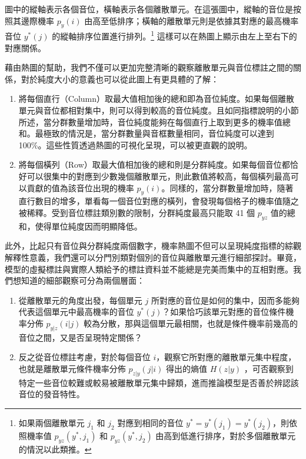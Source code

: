         圖中的縱軸表示各個音位，橫軸表示各個離散單元。在這張圖中，縱軸的音位是按照其邊際機率 \(p_y(i)\) 由高至低排序；橫軸的離散單元則是依據其對應的最高機率音位 \(y^\ast(j)\) 的縱軸排序位置進行排列。\footnote{如果兩個離散單元 \(j_1\) 和 \(j_2\) 對應到相同的音位 \(y^\ast = y^\ast(j_1) = y^\ast(j_2)\)，則依照機率值 \(p_{yz}(y^\ast, j_1)\) 和 \(p_{yz}(y^\ast, j_2)\) 由高到低進行排序，對於多個離散單元的情況以此類推。} 這樣可以在熱圖上顯示由左上至右下的對應關係。

        藉由熱圖的幫助，我們不僅可以更加完整清晰的觀察離散單元與音位標註之間的關係，對於純度大小的意義也可以從此圖上有更具體的了解：

        \begin{enumerate}
            \item 將每個直行（Column）取最大值相加後的總和即為音位純度。如果每個離散單元與音位都相對集中，則可以得到較高的音位純度。且如同指標說明的小節所述，當分群數量增加時，音位純度能夠在每個直行上取到更多的機率值總和。最極致的情況是，當分群數量與音框數量相同，音位純度可以達到 100\%。這些性質透過熱圖的可視化呈現，可以被更直觀的說明。

            \item 將每個橫列（Row）取最大值相加後的總和則是分群純度。如果每個音位都恰好可以很集中的對應到少數幾個離散單元，則此數值將較高，每個橫列最高可以貢獻的值為該音位出現的機率 $p_{y}(i)$。同樣的，當分群數量增加時，隨著直行數目的增多，單看每一個音位對應的橫列，會發現每個格子的機率值隨之被稀釋。受到音位標註類別數的限制，分群純度最高只能取 41 個 $p_{yz}$ 值的總和，使得單位純度因而明顯降低。
        \end{enumerate}

        此外，比起只有音位與分群純度兩個數字，機率熱圖不但可以呈現純度指標的綜觀解釋性意義，我們還可以分門別類對個別的音位與離散單元進行細部探討。畢竟，模型的虛擬標註與實際人類給予的標註資料並不能總是完美而集中的互相對應。我們想知道的細部觀察可分為兩個層面：

        \begin{enumerate}
            \item 從離散單元的角度出發，每個單元 $j$ 所對應的音位是如何的集中，因而多能夠代表這個單元中最高機率的音位 $y^*(j)$？如果恰巧該單元對應的音位條件機率分佈 $p_{y|z}(i|j)$ 較為分散，那與這個單元最相關，也就是條件機率前幾高的音位之間，又是否呈現特定關係？
            \item 反之從音位標註考慮，對於每個音位 $i$，觀察它所對應的離散單元集中程度，也就是離散單元條件機率分佈 $p_{z|y}(j|i)$ 得出的熵值 $H(z|y)$ ，可否觀察到特定一些音位較難或較易被離散單元集中歸類，進而推論模型是否善於辨認該音位的發音特性。
        \end{enumerate}

